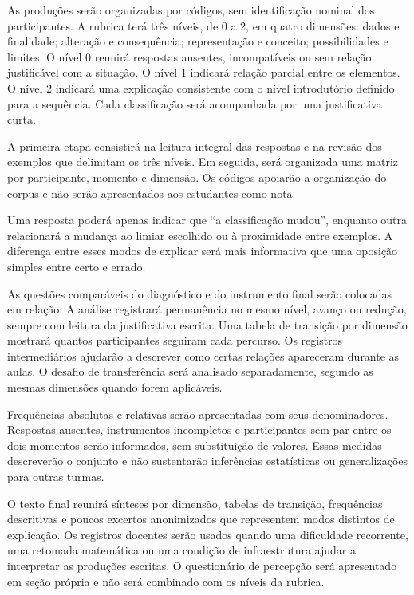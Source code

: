 As produções serão organizadas por códigos, sem identificação nominal dos participantes. A rubrica terá três níveis, de 0 a 2, em quatro dimensões: dados e finalidade; alteração e consequência; representação e conceito; possibilidades e limites. O nível 0 reunirá respostas ausentes, incompatíveis ou sem relação justificável com a situação. O nível 1 indicará relação parcial entre os elementos. O nível 2 indicará uma explicação consistente com o nível introdutório definido para a sequência. Cada classificação será acompanhada por uma justificativa curta.

A primeira etapa consistirá na leitura integral das respostas e na revisão dos exemplos que delimitam os três níveis. Em seguida, será organizada uma matriz por participante, momento e dimensão. Os códigos apoiarão a organização do corpus e não serão apresentados aos estudantes como nota.

Uma resposta poderá apenas indicar que ``a classificação mudou'', enquanto outra relacionará a mudança ao limiar escolhido ou à proximidade entre exemplos. A diferença entre esses modos de explicar será mais informativa que uma oposição simples entre certo e errado.

As questões comparáveis do diagnóstico e do instrumento final serão colocadas em relação. A análise registrará permanência no mesmo nível, avanço ou redução, sempre com leitura da justificativa escrita. Uma tabela de transição por dimensão mostrará quantos participantes seguiram cada percurso. Os registros intermediários ajudarão a descrever como certas relações apareceram durante as aulas. O desafio de transferência será analisado separadamente, segundo as mesmas dimensões quando forem aplicáveis.

Frequências absolutas e relativas serão apresentadas com seus denominadores. Respostas ausentes, instrumentos incompletos e participantes sem par entre os dois momentos serão informados, sem substituição de valores. Essas medidas descreverão o conjunto e não sustentarão inferências estatísticas ou generalizações para outras turmas.

O texto final reunirá sínteses por dimensão, tabelas de transição, frequências descritivas e poucos excertos anonimizados que representem modos distintos de explicação. Os registros docentes serão usados quando uma dificuldade recorrente, uma retomada matemática ou uma condição de infraestrutura ajudar a interpretar as produções escritas. O questionário de percepção será apresentado em seção própria e não será combinado com os níveis da rubrica.

